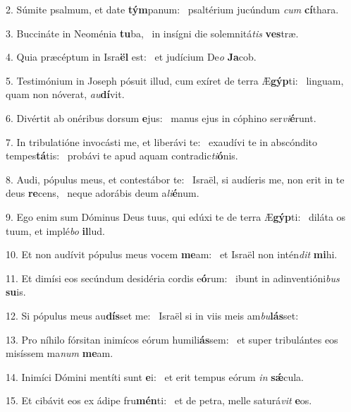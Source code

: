 2. Súmite psalmum, et date \textbf{tým}panum: \ast\  psaltérium jucúndum \textit{cum} \textbf{cí}thara.\

3. Buccináte in Neoménia \textbf{tu}ba, \ast\  in insígni die solemnitá\textit{tis} \textbf{ves}træ.\

4. Quia præcéptum in Isra\textbf{ël} est: \ast\  et judícium De\textit{o} \textbf{Ja}cob.\

5. Testimónium in Joseph pósuit illud, cum exíret de terra Æ\textbf{gýp}ti: \ast\  linguam, quam non nóverat, \textit{au}\textbf{dí}vit.\

6. Divértit ab onéribus dorsum \textbf{e}jus: \ast\  manus ejus in cóphino ser\textit{vi}\textbf{é}runt.\

7. In tribulatióne invocásti me, et liberávi te: \dag\  exaudívi te in abscóndito tempes\textbf{tá}tis: \ast\  probávi te apud aquam contradic\textit{ti}\textbf{ó}nis.\

8. Audi, pópulus meus, et contestábor te: \dag\  Israël, si audíeris me, non erit in te deus \textbf{re}cens, \ast\  neque adorábis deum a\textit{li}\textbf{é}num.\

9. Ego enim sum Dóminus Deus tuus, qui edúxi te de terra Æ\textbf{gýp}ti: \ast\  diláta os tuum, et implé\textit{bo} \textbf{il}lud.\

10. Et non audívit pópulus meus vocem \textbf{me}am: \ast\  et Israël non intén\textit{dit} \textbf{mi}hi.\

11. Et dimísi eos secúndum desidéria cordis e\textbf{ó}rum: \ast\  ibunt in adinventióni\textit{bus} \textbf{su}is.\

12. Si pópulus meus au\textbf{dís}set me: \ast\  Israël si in viis meis am\textit{bu}\textbf{lás}set:\

13. Pro níhilo fórsitan inimícos eórum humili\textbf{ás}sem: \ast\  et super tribulántes eos misíssem ma\textit{num} \textbf{me}am.\

14. Inimíci Dómini mentíti sunt \textbf{e}i: \ast\  et erit tempus eórum \textit{in} \textbf{sǽ}cula.\

15. Et cibávit eos ex ádipe fru\textbf{mén}ti: \ast\  et de petra, melle saturá\textit{vit} \textbf{e}os.\

